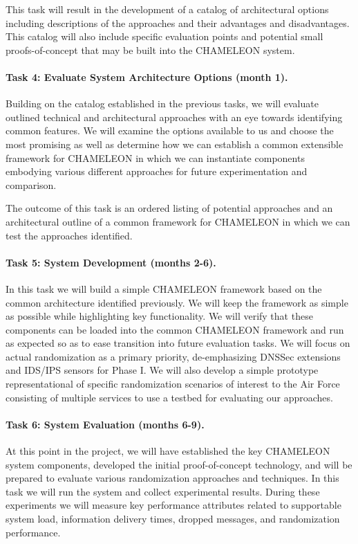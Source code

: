 \documentclass{sbir}
\begin{document}
This task will result in the development of a catalog of architectural options including descriptions of the approaches and their advantages and disadvantages. This catalog will also include specific evaluation points and potential small proofs-of-concept that may be built into the CHAMELEON system.

\paragraph{Task 4: Evaluate System Architecture Options (month 1).}
Building on the catalog established in the previous tasks, we will evaluate outlined technical and architectural approaches with an eye towards identifying common features. We will examine the options available to us and choose the most promising as well as determine how we can establish a common extensible framework for CHAMELEON in which we can instantiate components embodying various different approaches for future experimentation and comparison.

The outcome of this task is an ordered listing of potential approaches and an architectural outline of a common framework for CHAMELEON in which we can test the approaches identified.

\paragraph{Task 5: System Development (months 2-6).}
In this task we will build a simple CHAMELEON framework based on the common architecture identified previously. We will keep the framework as simple as possible while highlighting key functionality. We will verify that these components can be loaded into the common CHAMELEON framework and run as expected so as to ease transition into future evaluation tasks. We will focus on actual randomization as a primary priority, de-emphasizing DNSSec extensions and IDS/IPS sensors for Phase I. We will also develop a simple prototype representational of specific randomization scenarios of interest to the Air Force consisting of multiple services to use a testbed for evaluating our approaches.

\paragraph{Task 6: System Evaluation (months 6-9).}
At this point in the project, we will have established the key CHAMELEON system components, developed the initial proof-of-concept technology, and will be prepared to evaluate various randomization approaches and techniques. In this task we will run the system and collect experimental results. During these experiments we will measure key performance attributes related to supportable system load, information delivery times, dropped messages, and randomization performance. 
\end{document}
